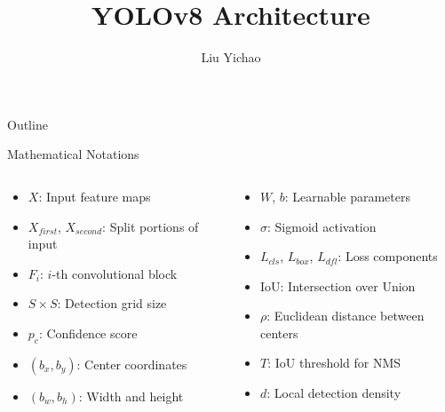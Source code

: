 \documentclass{beamer}
\title{YOLOv8 Architecture}
\author{Liu Yichao}
\date{}
\begin{document}
\begin{frame}
\titlepage
\end{frame}
\begin{frame}{Outline}
    \tableofcontents
\end{frame}
\begin{frame}{Mathematical Notations}
    \begin{columns}
        \begin{column}{0.5\textwidth}
            \begin{itemize}
                \item $X$: Input feature maps
                \item $X_{first}$, $X_{second}$: Split portions of input
                \item $F_i$: $i$-th convolutional block
                \item $S \times S$: Detection grid size
                \item $p_c$: Confidence score
                \item $(b_x, b_y)$: Center coordinates
                \item $(b_w, b_h)$: Width and height
            \end{itemize}
        \end{column}
        \begin{column}{0.5\textwidth}
            \begin{itemize}
                \item $W$, $b$: Learnable parameters
                \item $\sigma$: Sigmoid activation
                \item $L_{cls}$, $L_{box}$, $L_{dfl}$: Loss components
                \item IoU: Intersection over Union
                \item $\rho$: Euclidean distance between centers
                \item $T$: IoU threshold for NMS
                \item $d$: Local detection density
            \end{itemize}
        \end{column}
    \end{columns}
\end{frame}
\end{document}
